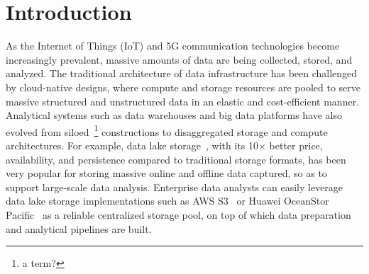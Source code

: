 \section{Introduction} 
\label{sec:intro}


As the Internet of Things (IoT) and 5G communication technologies become increasingly prevalent, massive amounts of data are being collected, stored, and analyzed.
 The traditional architecture of data infrastructure  has been challenged by cloud-native designs, where compute and storage resources are pooled to serve massive structured and unstructured data in an elastic and cost-efficient manner.
  Analytical systems such as data warehouses and big data platforms have also evolved from siloed~\footnote{a term?} constructions to disaggregated storage and compute architectures. For example, data lake storage~\cite{}, with its 10$\times$ better price, availability, and persistence compared to traditional storage formats, has been very popular for storing massive online and offline data captured, so as to support large-scale data analysis.
   Enterprise data analysts can easily leverage data lake storage implementations such as AWS S3~\cite{} or Huawei OceanStor Pacific~\cite{} as a reliable centralized  storage pool, on top of which  data preparation and analytical pipelines are built.

